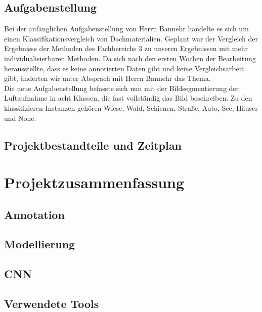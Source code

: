 \section{Aufgabenstellung}
Bei der anfänglichen Aufgabenstellung von Herrn Bannehr handelte es sich um einen Klassifikationsvergleich von Dachmaterialien.
Geplant war der Vergleich der Ergebnisse der Methoden des Fachbereichs 3 zu unseren Ergebnissen mit mehr individualisierbaren Methoden.
Da sich nach den ersten Wochen der Bearbeitung herausstellte, dass es keine annotierten Daten gibt und keine Vergleichsarbeit gibt,
änderten wir unter Absprach mit Herrn Bannehr das Thema.\\
Die neue Aufgabenstellung befasste sich nun mit der Bildsegmentierung der Luftaufnahme in acht Klassen, die fast vollständig
das Bild beschreiben. Zu den klassifizieren Instanzen gehören Wiese, Wald, Schienen, Straße, Auto, See, Häuser und None.

\section{Projektbestandteile und Zeitplan}

\subsection{}




\newpage %

\chapter{Projektzusammenfassung}\thispagestyle{fancy}

\section{Annotation}

\section{Modellierung}

\section{CNN}

\section{Verwendete Tools}

